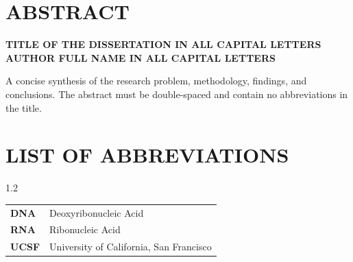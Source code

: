 \documentclass[12pt,oneside]{report}
\begin{document}
\chapter*{ABSTRACT}
\doublespacing
\begin{center}
  \textbf{TITLE OF THE DISSERTATION IN ALL CAPITAL LETTERS}\\[0.08in]
  \textbf{AUTHOR FULL NAME IN ALL CAPITAL LETTERS}
\end{center}
\vspace{0.05in}

\noindent A concise synthesis of the research problem, methodology, findings, and conclusions. The abstract must be double-spaced and contain no abbreviations in the title.
\clearpage

\begin{doublespace}
\tableofcontents
\end{doublespace}
\clearpage

\listoffigures
\clearpage

\listoftables
\clearpage

\chapter*{LIST OF ABBREVIATIONS}
\begin{setstretch}{1.2}
\renewcommand{\arraystretch}{1.45}
\setlength{\LTleft}{0pt}
\begin{longtable}{@{}lp{5in}@{}}
  \textbf{DNA} & Deoxyribonucleic Acid \\
  \textbf{RNA} & Ribonucleic Acid \\
  \textbf{UCSF} & University of California, San Francisco \\
\end{longtable}
\end{setstretch}
\clearpage
\end{document}
